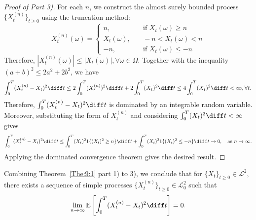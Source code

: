 \begin{proof}[Proof of Part 3)]
For each $n$, we construct the almost surely bounded process $\{X_t^{(n)}\}_{t\ge0}$ using the truncation method:
\[
X_t^{(n)}(\omega) = \left\{
\begin{aligned}
n,&\quad \text{if }X_t(\omega)\ge n\\
X_t(\omega),&\quad -n<X_t(\omega)<n\\
-n,&\quad \text{if }X_t(\omega)\le -n
\end{aligned}
\right.
\]
Therefore, $|X_t^{(n)}(\omega)|\le |X_t(\omega)|,\forall\omega\in\Omega$. Together with the inequality $(a+b)^2\le 2a^2+2b^2$, we have
\[
\int_0^T(X_t^{(n)} - X_t)^2\diff t\le 2 \int_0^T(X_t^{(n)})^2\diff t + 2\int_0^T(X_t)^2\diff  t\le 4
\int_0^T(X_t)^2\diff  t<\infty,\forall t.
\]
Therefore, $\int_0^T(X_t^{(n)} - X_t)^2\diff t$ is dominated by an integrable random variable.
Moreover, substituting the form of $X_t^{(n)}$ and considering $\int_0^T(X_t)^2\diff t<\infty$ gives
\[
\int_0^T(X_t^{(n)} - X_t)^2\diff t\le \int_0^T(X_t)^21\{(X_t)^2\ge n\}\diff t+\int_0^T(X_t)^21\{(X_t)^2\le -n\}\diff t\to0,\quad \text{as }n\to\infty.
\]
Applying the dominated convergence theorem gives the desired result.



\end{proof}






Combining Theorem~\ref{The:9:1} part 1) to 3), we conclude that for $\{X_t\}_{t\ge0}\in\mathcal{L}^2$,
there exists a sequence of simple processes $\{X_t^{(n)}\}_{t\ge0}\in\mathcal{L}^2_0$ such that
\[
\lim_{n\to\infty}\mathbb{E}\left[
\int_0^T(X_t^{(n)} - X_t)^2\diff t
\right]=0.
\]













